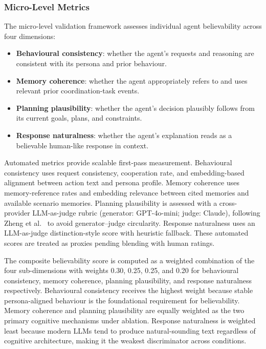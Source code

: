 \documentclass[11pt]{article}
\begin{document}
\subsubsection{Micro-Level Metrics}
The micro-level validation framework assesses individual agent believability across four dimensions:

\begin{itemize}
    \item \textbf{Behavioural consistency}: whether the agent's requests and reasoning are consistent with its persona and prior behaviour.
    \item \textbf{Memory coherence}: whether the agent appropriately refers to and uses relevant prior coordination-task events.
    \item \textbf{Planning plausibility}: whether the agent's decision plausibly follows from its current goals, plans, and constraints.
    \item \textbf{Response naturalness}: whether the agent's explanation reads as a believable human-like response in context.
\end{itemize}

Automated metrics provide scalable first-pass measurement. Behavioural consistency uses request consistency, cooperation rate, and embedding-based alignment between action text and persona profile. Memory coherence uses memory-reference rates and embedding relevance between cited memories and available scenario memories. Planning plausibility is assessed with a cross-provider LLM-as-judge rubric (generator: GPT-4o-mini; judge: Claude), following Zheng et al.~\cite{zheng2023judging} to avoid generator--judge circularity. Response naturalness uses an LLM-as-judge distinction-style score with heuristic fallback. These automated scores are treated as proxies pending blending with human ratings.

The composite believability score is computed as a weighted combination of the four sub-dimensions with weights 0.30, 0.25, 0.25, and 0.20 for behavioural consistency, memory coherence, planning plausibility, and response naturalness respectively. Behavioural consistency receives the highest weight because stable persona-aligned behaviour is the foundational requirement for believability. Memory coherence and planning plausibility are equally weighted as the two primary cognitive mechanisms under ablation. Response naturalness is weighted least because modern LLMs tend to produce natural-sounding text regardless of cognitive architecture, making it the weakest discriminator across conditions.
\end{document}
